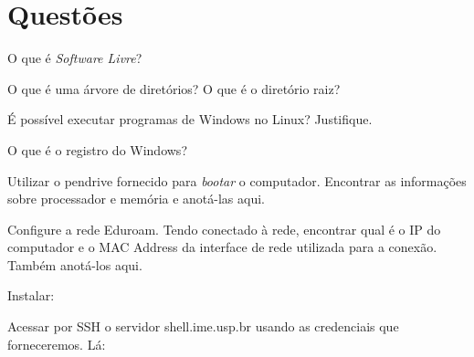 


\siheader
\section*{Questões}
\begin{questions}

\question
O que é \textit{Software Livre}?
\vfill

\question
O que é uma árvore de diretórios? O que é o diretório raiz?
\vfill

\question
É possível executar programas de Windows no Linux? Justifique.
\vfill

\question
O que é o registro do Windows?
\vfill

\question
Utilizar o pendrive fornecido para \emph{bootar} o computador. Encontrar as informações sobre processador e memória e anotá-las aqui.
\vfill

\question
Configure a rede Eduroam. Tendo conectado à rede, encontrar qual é o IP do computador e o MAC Address da interface de rede utilizada para a conexão. Também anotá-los aqui.
\vfill

\question
Instalar:

\question
Acessar por SSH o servidor shell.ime.usp.br usando as credenciais que forneceremos. Lá:

\end{questions}

